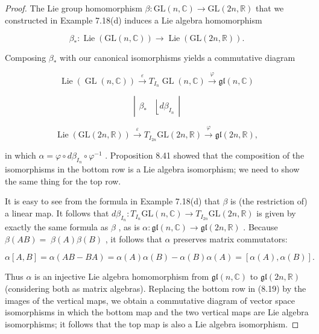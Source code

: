 \begin{proof}
\leanok
The Lie group homomorphism $\beta  : \mathrm{{GL}}\left( {n,\mathbb{C}}\right)  \rightarrow  \mathrm{{GL}}\left( {{2n},\mathbb{R}}\right)$ that we constructed in Example 7.18(d) induces a Lie algebra homomorphism

\[
{\beta }_{ * } : \operatorname{Lie}\left( {\mathrm{{GL}}\left( {n,\mathbb{C}}\right) }\right)  \rightarrow  \operatorname{Lie}\left( {\mathrm{{GL}}\left( {{2n},\mathbb{R}}\right) }\right) .
\]

Composing ${\beta }_{ * }$ with our canonical isomorphisms yields a commutative diagram

\[
\operatorname{Lie}\left( {\operatorname{GL}\left( {n,\mathbb{C}}\right) }\right) \overset{\varepsilon }{ \rightarrow  }{T}_{{I}_{n}}\operatorname{GL}\left( {n,\mathbb{C}}\right) \overset{\varphi }{ \rightarrow  }\mathfrak{{gl}}\left( {n,\mathbb{C}}\right)
\]

\[
\left| \begin{array}{ll} {\beta }_{ * } & \left\lfloor  {d{\beta }_{{I}_{n}}}\right.  \end{array}\right| \tag{8.19}
\]

\[
\operatorname{Lie}\left( {\mathrm{{GL}}\left( {{2n},\mathbb{R}}\right) }\right) \overset{\varepsilon }{ \rightarrow  }{T}_{{I}_{2n}}\mathrm{{GL}}\left( {{2n},\mathbb{R}}\right) \overset{\varphi }{ \rightarrow  }\mathfrak{{gl}}\left( {{2n},\mathbb{R}}\right) ,
\]

in which $\alpha  = \varphi  \circ  d{\beta }_{{I}_{n}} \circ  {\varphi }^{-1}$ . Proposition 8.41 showed that the composition of the isomorphisms in the bottom row is a Lie algebra isomorphism; we need to show the same thing for the top row.

It is easy to see from the formula in Example 7.18(d) that $\beta$ is (the restriction of) a linear map. It follows that $d{\beta }_{{I}_{n}} : {T}_{{I}_{n}}\mathrm{{GL}}\left( {n,\mathbb{C}}\right)  \rightarrow  {T}_{{I}_{2n}}\mathrm{{GL}}\left( {{2n},\mathbb{R}}\right)$ is given by exactly the same formula as $\beta$ , as is $\alpha  : \mathfrak{{gl}}\left( {n,\mathbb{C}}\right)  \rightarrow  \mathfrak{{gl}}\left( {{2n},\mathbb{R}}\right)$ . Because $\beta \left( {AB}\right)  = \; \beta \left( A\right) \beta \left( B\right)$ , it follows that $\alpha$ preserves matrix commutators:

\[
\alpha \left\lbrack  {A, B}\right\rbrack   = \alpha \left( {{AB} - {BA}}\right)  = \alpha \left( A\right) \alpha \left( B\right)  - \alpha \left( B\right) \alpha \left( A\right)  = \left\lbrack  {\alpha \left( A\right) ,\alpha \left( B\right) }\right\rbrack  .
\]

Thus $\alpha$ is an injective Lie algebra homomorphism from $\mathfrak{{gl}}\left( {n,\mathbb{C}}\right)$ to $\mathfrak{{gl}}\left( {{2n},\mathbb{R}}\right)$ (considering both as matrix algebras). Replacing the bottom row in (8.19) by the images of the vertical maps, we obtain a commutative diagram of vector space isomorphisms in which the bottom map and the two vertical maps are Lie algebra isomorphisms; it follows that the top map is also a Lie algebra isomorphism.
\end{proof}

